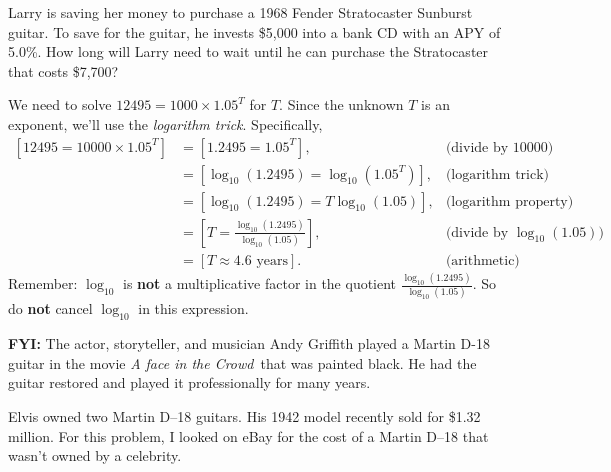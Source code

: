 \documentclass[12pt,fleqn]{exam}
\begin{document}
\begin{questions}
\begin{solution}
\end{solution}

\question [2] Larry is saving her money to purchase a
1968 Fender Stratocaster Sunburst guitar.
To save for the guitar, he invests \$5,000 into a bank CD with an APY of 5.0\%. 
How long will Larry need to wait until he can purchase the Stratocaster that costs
\$7,700?

\begin{solution}[3.0in]
    We need to solve $12495 = 1000 \times 1.05^T$ for $T$. Since the unknown
    $T$ is an exponent, we'll use the \emph{logarithm trick}. Specifically,
    \begin{align*}
      \left[12495 = 10000 \times 1.05^T \right] &= \left[1.2495 = 1.05^T \right], &\mbox{(divide by 10000)} \\
                     &= \left[\log_{10}(1.2495) = \log_{10}(1.05^T) \right],  &\mbox{(logarithm trick)} \\
                     &= \left[\log_{10}(1.2495) = T \log_{10}(1.05) \right],  &\mbox{(logarithm property)} \\
                     &= \left[ T = \frac{\log_{10}(1.2495)}{\log_{10}(1.05)} \right],  &\mbox{(divide by $\log_{10}(1.05)$)} \\
                     &= \left[ T \approx 4.6 \mbox{ years} \right].  &\mbox{(arithmetic)}
    \end{align*}
Remember: $\log_{10}$ is \textbf{not} a multiplicative factor 
in the quotient $\displaystyle \frac{\log_{10}(1.2495)}{\log_{10}(1.05)}$. 
So do \textbf{not} cancel $\log_{10}$ in this expression.


\textbf{FYI:} The actor, storyteller, and musician Andy Griffith played a Martin D-18 guitar in the movie \emph{A face in the Crowd}\
that was painted black. He had the guitar restored and played it professionally
for many years. 

\quad Elvis owned two Martin D--18 guitars. His 1942 model recently sold for \$1.32 million. For this problem, I looked on eBay for the cost of
a Martin D--18 that wasn't owned by a celebrity. 
\end{solution}


\end{questions}
\end{document}

